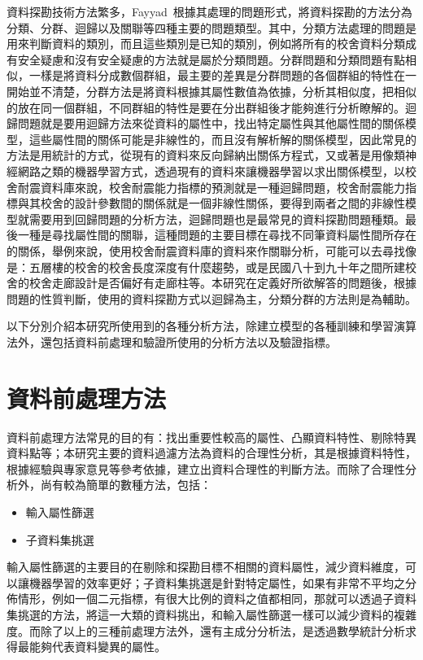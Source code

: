 資料探勘技術方法繁多，Fayyad~\cite{fayyad1996data}根據其處理的問題形式，將資料探勘的方法分為分類、分群、迴歸以及關聯等四種主要的問題類型。其中，分類方法處理的問題是用來判斷資料的類別，而且這些類別是已知的類別，例如將所有的校舍資料分類成有安全疑慮和沒有安全疑慮的方法就是屬於分類問題。分群問題和分類問題有點相似，一樣是將資料分成數個群組，最主要的差異是分群問題的各個群組的特性在一開始並不清楚，分群方法是將資料根據其屬性數值為依據，分析其相似度，把相似的放在同一個群組，不同群組的特性是要在分出群組後才能夠進行分析瞭解的。迴歸問題就是要用迴歸方法來從資料的屬性中，找出特定屬性與其他屬性間的關係模型，這些屬性間的關係可能是非線性的，而且沒有解析解的關係模型，因此常見的方法是用統計的方式，從現有的資料來反向歸納出關係方程式，又或著是用像類神經網路之類的機器學習方式，透過現有的資料來讓機器學習以求出關係模型，以校舍耐震資料庫來說，校舍耐震能力指標的預測就是一種迴歸問題，校舍耐震能力指標與其校舍的設計參數間的關係就是一個非線性關係，要得到兩者之間的非線性模型就需要用到回歸問題的分析方法，迴歸問題也是最常見的資料探勘問題種類。最後一種是尋找屬性間的關聯，這種問題的主要目標在尋找不同筆資料屬性間所存在的關係，舉例來說，使用校舍耐震資料庫的資料來作關聯分析，可能可以去尋找像是：五層樓的校舍的校舍長度深度有什麼趨勢，或是民國八十到九十年之間所建校舍的校舍走廊設計是否偏好有走廊柱等。本研究在定義好所欲解答的問題後，根據問題的性質判斷，使用的資料探勘方式以迴歸為主，分類分群的方法則是為輔助。

以下分別介紹本研究所使用到的各種分析方法，除建立模型的各種訓練和學習演算法外，還包括資料前處理和驗證所使用的分析方法以及驗證指標。


\section{資料前處理方法}

資料前處理方法常見的目的有：找出重要性較高的屬性、凸顯資料特性、剔除特異資料點等；本研究主要的資料過濾方法為資料的合理性分析，其是根據資料特性，根據經驗與專家意見等參考依據，建立出資料合理性的判斷方法。而除了合理性分析外，尚有較為簡單的數種方法，包括：

\begin{itemize}
\item 輸入屬性篩選
\item 子資料集挑選
\end{itemize}

輸入屬性篩選的主要目的在剔除和探勘目標不相關的資料屬性，減少資料維度，可以讓機器學習的效率更好；子資料集挑選是針對特定屬性，如果有非常不平均之分佈情形，例如一個二元指標，有很大比例的資料之值都相同，那就可以透過子資料集挑選的方法，將這一大類的資料挑出，和輸入屬性篩選一樣可以減少資料的複雜度。而除了以上的三種前處理方法外，還有主成分分析法，是透過數學統計分析求得最能夠代表資料變異的屬性。

